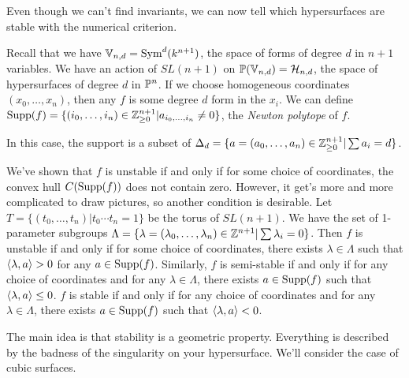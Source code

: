 
Even though we can't find invariants, we can now tell which hypersurfaces are stable with the numerical criterion.

Recall that we have $\mathbb{V}_{n,d}=\operatorname{Sym}^d(k^{n+1})$, the space of forms of degree $d$ in $n+1$ variables. We have an action of $SL(n+1)$ on $\mathbb{P}(\mathbb{V}_{n,d})=\mathcal{H}_{n,d}$, the space of hypersurfaces of degree $d$ in $\mathbb{P}^n$. If we choose homogeneous coordinates $(x_0,\dots, x_n)$, then any $f$ is some degree $d$ form in the $x_i$. We can define $\operatorname{Supp}(f)=\{(i_0,\dots,i_n)\in \mathbb{Z}^{n+1}_{\ge 0}|a_{i_0,\dots,i_n}\neq 0\}$, the \emph{Newton polytope} of $f$.

In this case, the support is a subset of $\Delta_d=\{a=(a_0,\dots, a_n)\in \mathbb{Z}^{n+1}_{\ge 0}|\sum a_i=d\}$. 

We've shown that $f$ is unstable if and only if for some choice of coordinates, the convex hull $C(\operatorname{Supp}(f))$ does not contain zero. However, it get's more and more complicated to draw pictures, so another condition is desirable. Let $T=\{(t_0,\dots, t_n)|t_0\cdots t_n=1\}$ be the torus of $SL(n+1)$. We have the set of 1-parameter subgroups $\Lambda=\{\lambda=(\lambda_0,\dots, \lambda_n)\in\mathbb{Z}^{n+1}|\sum \lambda_i=0\}$. Then $f$ is unstable if and only if for some choice of coordinates, there exists $\lambda\in \Lambda$ such that $\langle\lambda,a\rangle>0$ for any $a\in \operatorname{Supp}(f)$. Similarly, $f$ is semi-stable if and only if for any choice of coordinates and for any $\lambda\in \Lambda$, there exists $a\in \operatorname{Supp}(f)$ such that $\langle\lambda,a\rangle \le 0$. $f$ is stable if and only if for any choice of coordinates and for any $\lambda\in \Lambda$, there exists $a\in \operatorname{Supp}(f)$ such that $\langle\lambda,a\rangle < 0$. 

The main idea is that stability is a geometric property. Everything is described by the badness of the singularity on your hypersurface. We'll consider the case of cubic surfaces. 

